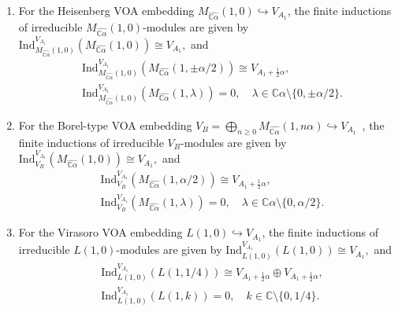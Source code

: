 \documentclass[12pt,a4paper,reqno]{amsart}
\numberwithin{equation}{section}
\numberwithin{equation}{section}
\theoremstyle{definition}
\def \C {\mathbb{C}}
\def\Ind{\mathrm{Ind}}
\def\Ind{\mathrm{Ind}}
\begin{document}
\begin{enumerate}
	\item For the Heisenberg VOA embedding $M_{\widehat{\C \alpha}}(1,0) \hookrightarrow V_{A_1}$, the finite inductions of irreducible $M_{\widehat{\C \alpha}}(1,0)$-modules are given by
$
	\mathrm{Ind}_{M_{\widehat{\C \alpha}}(1,0)}^{V_{A_1}} (M_{\widehat{\C \alpha}}(1,0)) \cong V_{A_1},$	and
	\begin{equation}\label{eq:introheisenberg}
		\begin{aligned}
			&\mathrm{Ind}_{M_{\widehat{\C \alpha}}(1,0)}^{V_{A_1}} (M_{\widehat{\C \alpha}}(1,\pm \alpha/2)) \cong V_{A_1 + \frac{1}{2}\alpha},\\
			&\mathrm{Ind}_{M_{\widehat{\C \alpha}}(1,0)}^{V_{A_1}} (M_{\widehat{\C \alpha}}(1,\lambda)) = 0,
			\quad \lambda \in \C \alpha \setminus \{0, \pm \alpha/2\}.
		\end{aligned}
	\end{equation}
	
	\item For the Borel-type VOA embedding $V_B = \bigoplus_{n \ge 0} M_{\widehat{\C \alpha}}(1, n\alpha) \hookrightarrow V_{A_1}$~\cite{Liu24}, the finite inductions of irreducible $V_B$-modules are given by $
	\mathrm{Ind}_{V_B}^{V_{A_1}} (M_{\widehat{\C \alpha}}(1,0)) \cong V_{A_1},
$
	and
	\begin{equation}\label{eq:introBorel}
		\begin{aligned}
			&\mathrm{Ind}_{V_B}^{V_{A_1}} (M_{\widehat{\C \alpha}}(1, \alpha/2)) \cong V_{A_1 + \frac{1}{2}\alpha},\\
			&\mathrm{Ind}_{V_B}^{V_{A_1}} (M_{\widehat{\C \alpha}}(1, \lambda)) = 0,
			\quad \lambda \in \C \alpha \setminus \{0, \alpha/2\}.
		\end{aligned}
	\end{equation}
	
	\item For the Virasoro VOA embedding $L(1,0) \hookrightarrow V_{A_1}$, the finite inductions of irreducible $L(1,0)$-modules are given by
$
	\Ind^{V_{A_1}}_{L(1,0)} (L(1,0)) \cong V_{A_1},
$
	and
	\begin{equation}\label{eq:introVir}
		\begin{aligned}
			&\Ind^{V_{A_1}}_{L(1,0)} (L(1,1/4)) \cong V_{A_1 + \frac{1}{2}\alpha} \oplus V_{A_1 + \frac{1}{2}\alpha},\\
			&\Ind^{V_{A_1}}_{L(1,0)} (L(1,k)) = 0,
			\quad k \in \C \setminus \{0, 1/4\}.
		\end{aligned}
	\end{equation}
\end{enumerate}
\end{document}
